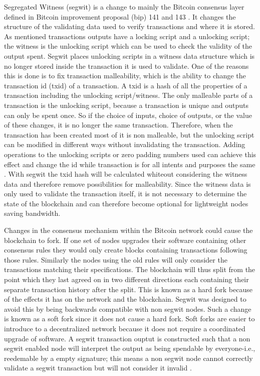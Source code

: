 Segregated Witness (segwit) is a change to mainly the Bitcoin consensus layer defined in Bitcoin improvement proposal (bip) 141 and 143 \cite{BIP141,BIP143}. It changes the structure of the validating data used to verify transactions and where it is stored. As mentioned transactions outputs have a locking script and a unlocking script; the witness is the unlocking script which can be used to check the validity of the output spent. Segwit places unlocking scripts in a witness data structure which is no longer stored inside the transaction it is used to validate. One of the reasons this is done is to fix transaction malleability, which is the ability to change the transaction id (txid) of a transaction. A txid is a hash of all the properties of a transaction including the unlocking script/witness. The only malleable parts of a transaction is the unlocking script, because a transaction is unique and outputs can only be spent once. So if the choice of inputs, choice of outputs, or the value of these changes, it is no longer the same transaction.
Therefore, when the transaction has been created most of it is non malleable, but the unlocking script can be modified in different ways without invalidating the transaction. Adding operations to the unlocking scripts or zero padding numbers used can achieve this effect and change the id while transaction is for all intents and purposes the same \cite{BIP62}. With segwit the txid hash will be calculated whiteout considering the witness data and therefore remove possibilities for malleability. Since the witness data is only used to validate the transaction itself, it is not necessary to determine the state of the blockchain and can therefore become optional for lightweight nodes saving bandwidth. 

Changes in the consensus mechanism within the Bitcoin network could cause the blockchain to fork. If one set of nodes upgrades their software containing other consensus rules they would only create blocks containing transactions following those rules. Similarly the nodes using the old rules will only consider the transactions matching their specifications. The blockchain will thus split from the point which they last agreed on in two different directions each containing their separate transaction history after the split. This is known as a hard fork because of the effects it has on the network and the blockchain. Segwit was designed to avoid this by being backwards compatible with non segwit nodes. Such a change is known as a soft fork since it does not cause a hard fork. Soft forks are easier to introduce to a decentralized network because it does not require a coordinated upgrade of software. A segwit transaction ouptut is constructed such that a non segwit enabled node will interpret the output as being spendable by everyone-i.e., reedemable by a empty signature; this means a non segwit node cannot correctly validate a segwit transaction but will not consider it invalid \cite{antonopoulos2017mastering}. 

